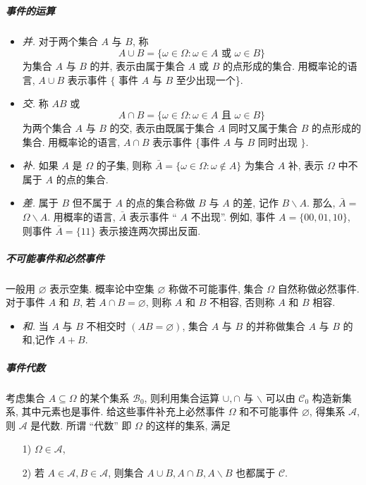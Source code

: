 \subparagraph{事件的运算}
\begin{itemize}
    \item \emph {并.} 对于两个集合 $A$ 与 $B$, 称
    $$
    A \cup B=\{\omega \in \Omega: \omega \in A \text { 或 } \omega \in B\}
    $$
    为集合 $A$ 与 $B$ 的并, 表示由属于集合 $A$ 或 $B$ 的点形成的集合. 用概率论的语言, $A \cup B$ 表示事件 $\{$ 事件 $A$ 与 $B$ 至少出现一个\}.
    \item \emph {交.} 称 $A B$ 或
    $$
    A \cap B=\{\omega \in \Omega: \omega \in A \text { 且 } \omega \in B\}
    $$
    为两个集合 $A$ 与 $B$ 的交, 表示由既属于集合 $A$ 同时又属于集合 $B$ 的点形成的集合. 用概率论的语言, $A \cap B$ 表示事件 \{事件 $A$ 与 $B$ 同时出现 $\}$.
    \item \emph{补.} 如果 $A$ 是 $\Omega$ 的子集, 则称 $\bar{A}=\{\omega \in \Omega: \omega \notin A\}$ 为集合 $A$ 补, 表示 $\Omega$ 中不属于 $A$ 的点的集合.
    \item \emph{差.} 属于 $B$ 但不属于 $A$ 的点的集合称做 $B$ 与 $A$ 的差, 记作 $B \backslash A$. 那么, $\bar{A}=$ $\Omega \backslash A$. 用概率的语言, $\bar{A}$ 表示事件 “ $A$ 不出现”. 例如, 事件 $A=\{00,01,10\}$, 则事件 $\bar{A}=\{11\}$ 表示接连两次掷出反面.
\end{itemize}

\subparagraph{不可能事件和必然事件} 一般用 $\varnothing$ 表示空集. 概率论中空集 $\varnothing$ 称做不可能事件, 集合 $\Omega$ 自然称做必然事件. 
对于事件 $A$ 和 $B$, 若 $A \cap B=\varnothing$, 则称 $A$ 和 $B$ 不相容, 否则称 $A$ 和 $B$ 相容. 
\begin{itemize}
    \item \emph{和. } 当 $A$ 与 $B$ 不相交时 $(A B=\varnothing)$, 集合 $A$ 与 $B$ 的并称做集合 $A$ 与 $B$ 的和,记作 $A+B$.
\end{itemize}

\subparagraph{事件代数} 考虑集合 $A \subseteq \Omega$ 的某个集系 $\mathscr{B}_0$, 则利用集合运算 $\cup, \cap$ 与 $\backslash$ 可以由 $\mathscr{C}_0$ 构造新集系, 其中元素也是事件. 给这些事件补充上必然事件 $\Omega$ 和不可能事件 $\varnothing$, 得集系 $\mathscr{A}$, 则 $\mathcal{A}$ 是代数. 所谓 “代数” 即 $\Omega$ 的这样的集系, 满足
\begin{itemize}
    \item [1)] $\Omega \in \mathscr{A}$,
    \item [2)] 若 $A \in \mathscr{A}, B \in \mathscr{A}$, 则集合 $A \cup B, A \cap B, A \backslash B$ 也都属于 $\mathscr{C}$.
\end{itemize}

